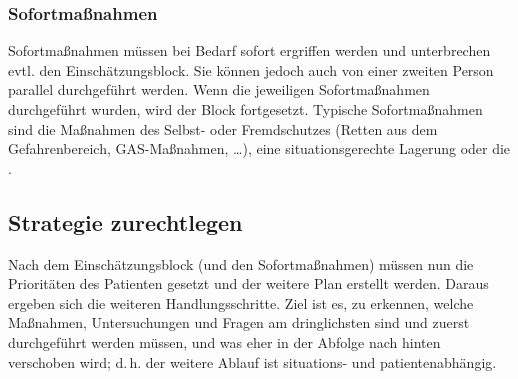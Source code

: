 \documentclass[
ngerman,
paper=a4,
asymmetric,
fontsize=10pt,
headings=small,
draft=false,
numbers=noenddot,
bibtotocnumbered,
footnotes=multiple,
]{scrreprt}
\begin{document}
\subsubsection{Sofortmaßnahmen}
\label{topic:patientenmanagement-erstmassnahmen}
\label{topic:patientenmanagement-sofortmassnahmen}


Sofortmaßnahmen müssen bei Bedarf sofort ergriffen
werden und unterbrechen evtl. den Einschätzungsblock. Sie
können jedoch auch von einer zweiten Person parallel
durchgeführt werden. Wenn die jeweiligen Sofortmaßnahmen durchgeführt
wurden, wird der Block fortgesetzt. Typische Sofortmaßnahmen
sind die Maßnahmen des Selbst- oder Fremdschutzes (Retten
aus dem Gefahrenbereich, GAS-Maßnahmen, \ldots), eine
situationsgerechte Lagerung oder die \EE{\TxMassVit}.





\subsection{Strategie zurechtlegen}

Nach dem Einschätzungsblock (und den Sofortmaßnahmen) müssen
nun die Prioritäten des Patienten gesetzt und der weitere
Plan erstellt werden. Daraus ergeben sich die weiteren
Handlungsschritte. Ziel ist es, zu erkennen, welche
Maßnahmen, Untersuchungen und Fragen am dringlichsten sind
und zuerst durchgeführt werden müssen, und was eher in der
Abfolge nach hinten ver\-schoben wird; d.\,h. der weitere
Ablauf ist situations- und patientenabhängig.
\end{document}
